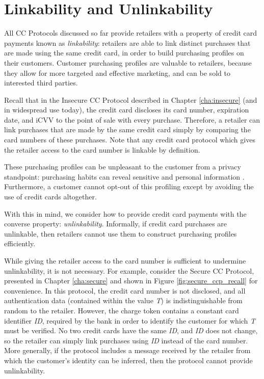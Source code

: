 \section{Linkability and Unlinkability}
\label{sec:unlinkability}

All CC Protocols discussed so far provide retailers with a property of credit card payments known as \emph{linkability}:
    retailers are able to link distinct purchases that are made using the same credit card, in order to build purchasing profiles on their customers.
Customer purchasing profiles are valuable to retailers, because they allow for more targeted and effective marketing, and can be sold to interested third parties.

Recall that in the Insecure CC Protocol described in Chapter \ref{cha:insecure} (and in widespread use today),
  the credit card discloses its card number, expiration date, and iCVV to the point of sale with every purchase.
Therefore, a retailer can link purchases that are made by the same credit card simply by comparing the card numbers of these purchases.
Note that any credit card protocol which gives the retailer access to the card number is linkable by definition.

These purchasing profiles can be unpleasant to the customer from a privacy standpoint:
  purchasing habits can reveal sensitive and personal information \cite{targetpregnant}.
Furthermore, a customer cannot opt-out of this profiling except by avoiding the use of credit cards altogether.

With this in mind, we consider how to provide credit card payments with the converse property: \emph{unlinkability}.
Informally, if credit card purchases are unlinkable, then retailers cannot use them to construct purchasing profiles efficiently.

While giving the retailer access to the card number is sufficient to undermine unlinkability, it is not necessary.
For example, consider the Secure CC Protocol, presented in Chapter \ref{cha:secure} and shown in Figure \ref{fig:secure_ccp_recall} for convenience.
In this protocol, the credit card number is not disclosed, and all authentication data (contained within the value \emph{T}) is indistinguishable from random to the retailer.
However, the charge token contains a constant card identifier \emph{ID}, required by the bank in order to identify the customer for which \emph{T} must be verified.
No two credit cards have the same \emph{ID}, and \emph{ID} does not change, so the retailer can simply link purchases using \emph{ID} instead of the card number.
More generally, if the protocol includes a message received by the retailer from which the customer's identity can be inferred, then the protocol cannot provide unlinkability.

